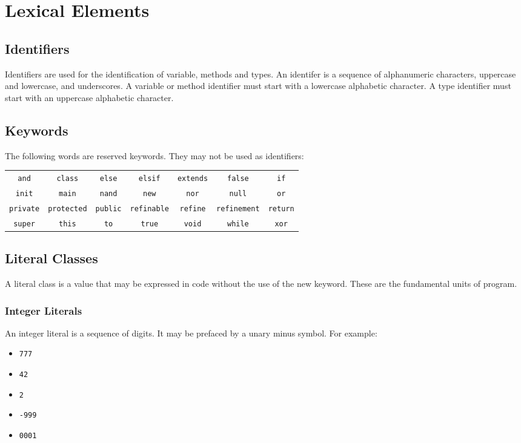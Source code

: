 \section{Lexical Elements}
\subsection{Identifiers}
Identifiers are used for the identification of variable,  methods and types. An identifer is a sequence of alphanumeric characters, uppercase and lowercase, and underscores. A variable or method identifier must start with a lowercase alphabetic character. A type identifier must start with an uppercase alphabetic character.

\subsection{Keywords}
The following words are reserved keywords. They may not be used as identifiers:
\begin{center}
\begin{tabular}{ccccccc}
\verb!and! & \verb!class! & \verb!else! & \verb!elsif! & \verb!extends! & \verb!false! & \verb!if!\\
\verb!init! & \verb!main! & \verb!nand! & \verb!new! & \verb!nor! & \verb!null! & \verb!or!\\
\verb!private! & \verb!protected! & \verb!public! & \verb!refinable! & \verb!refine! & \verb!refinement! & \verb!return!\\
\verb!super! & \verb!this! & \verb!to! & \verb!true! & \verb!void! & \verb!while! & \verb!xor!\\
\end{tabular}
\end{center}

\subsection{Literal Classes}
A literal class is a value that may be expressed in code without the use of the new keyword. These are the fundamental units of program.

\subsubsection{Integer Literals}
An integer literal is a sequence of digits. It may be prefaced by a unary minus symbol. For example:
\begin{itemize}
\item \verb!777!
\item \verb!42!
\item \verb!2!
\item \verb!-999!
\item \verb!0001!
\end{itemize}

